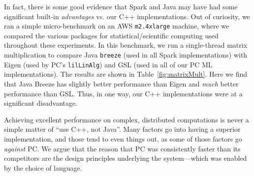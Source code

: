 In fact, there is some good evidence that Spark and Java may have had some significant
built-in \emph{advantages} vs. our C++ implementations.
Out of curiosity, we ran a simple micro-benchmark on an AWS \texttt{m2.4xlarge} machine, where we compared the various
packages for statistical/scientific computing used throughout these experiments.
In this benchmark, we run a single-thread matrix multiplication
to compare Java \texttt{breeze} (used in all Spark implementations) 
with Eigen (used by PC's \texttt{lilLinAlg}) and GSL (used in all of our PC ML implementations).
The results are shown in Table~\ref{fig:matrixMult}.  
Here we find that Java Breeze has slightly better performance than Eigen and \emph{much}
better performance than GSL.  
Thus, in one way, our C++ implementations were at a significant disadvantage.

Achieving excellent performance on complex, distributed computations is never a simple matter
of ``use C++, not Java''.  Many factors go into having a superior implementation, and those tend to even things out,
as some of those factors 
go \emph{against} PC.  We argue that the reason that PC was consistently faster
than its competitors are the design principles underlying the system---which was enabled by the choice of language.

